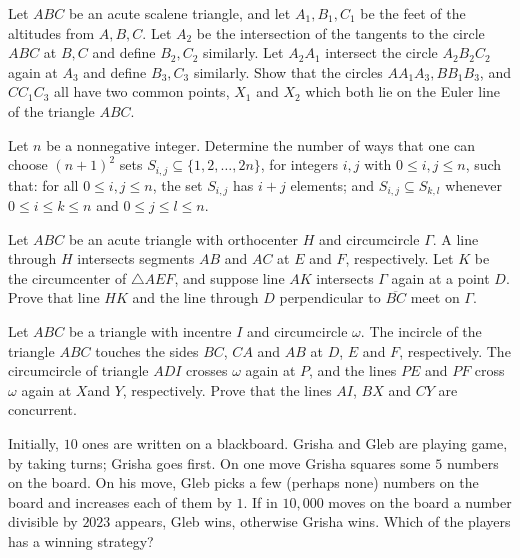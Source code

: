 \documentclass[11pt]{scrartcl}
\begin{document}
\begin{problem}[8330669807899443473]
Let $ABC$ be an acute scalene triangle, and let $A_1, B_1, C_1$ be the feet of the altitudes from $A, B, C$. Let $A_2$ be the intersection of the tangents to the circle $ABC$ at $B, C$ and define $B_2, C_2$ similarly. Let $A_2A_1$ intersect the circle $A_2B_2C_2$ again at $A_3$ and define $B_3, C_3$ similarly. Show that the circles $AA_1A_3, BB_1B_3$, and $CC_1C_3$ all have two common points, $X_1$ and $X_2$ which both lie on the Euler line of the triangle $ABC$.
\end{problem}
\begin{problem}[141955509989127]
Let $n$ be a nonnegative integer. Determine the number of ways that one can choose $(n+1)^2$ sets $S_{i,j}\subseteq\{1,2,\ldots,2n\}$, for integers $i,j$ with $0\leq i,j\leq n$, such that:
for all $0\leq i,j\leq n$, the set $S_{i,j}$ has $i+j$ elements; and
$S_{i,j}\subseteq S_{k,l}$ whenever $0\leq i\leq k\leq n$ and $0\leq j\leq l\leq n$.
\end{problem}
\begin{problem}[896600029778859256]
	Let $ABC$ be an acute triangle with orthocenter $H$ and circumcircle $\Gamma$. A line through $H$ intersects segments $AB$ and $AC$ at $E$ and $F$, respectively. Let $K$ be the circumcenter of $\triangle AEF$, and suppose line $AK$ intersects $\Gamma$ again at a point $D$. Prove that line $HK$ and the line through $D$ perpendicular to $\overline{BC}$ meet on $\Gamma$.
\end{problem}
\begin{problem}[7553717274310387624]
Let $ABC$ be a triangle with incentre $I$ and circumcircle $\omega$. The incircle of the triangle $ABC$
touches the sides $BC$, $CA$ and $AB$ at $D$, $E$ and $F$, respectively. The circumcircle of triangle $ADI$ crosses $\omega$ again at $P$, and the lines $PE$ and $PF$ cross $\omega$ again at $X$and $Y$, respectively. Prove that the lines $AI$, $BX$ and $CY$ are concurrent.
\end{problem}
\begin{problem}[428632191392819]
Initially, $10$ ones are written on a blackboard. Grisha and Gleb are playing game, by taking turns; Grisha goes first. On one move Grisha squares some $5$ numbers on the board. On his move, Gleb picks a few (perhaps none) numbers on the board and increases each of them by $1$. If in $10,000$ moves on the board a number divisible by $2023$ appears, Gleb wins, otherwise Grisha wins. Which of the players has a winning strategy?
\end{problem}
\end{document}
